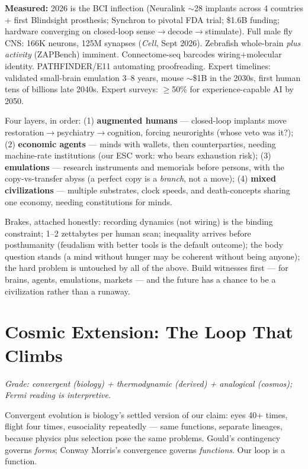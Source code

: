 \documentclass[11pt]{article}
\begin{document}
\textbf{Measured:} 2026 is the BCI inflection (Neuralink $\sim$28 implants across 4 countries + first Blindsight prosthesis; Synchron to pivotal FDA trial; \$1.6B funding; hardware converging on closed-loop sense$\to$decode$\to$stimulate). Full male fly CNS: 166K neurons, 125M synapses (\textit{Cell}, Sept 2026). Zebrafish whole-brain \emph{plus activity} (ZAPBench) imminent. Connectome-seq barcodes wiring+molecular identity. PATHFINDER/E11 automating proofreading. Expert timelines: validated small-brain emulation 3--8 years, mouse $\sim$\$1B in the 2030s, first human tens of billions late 2040s. Expert surveys: $\geq$50\% for experience-capable AI by 2050.

Four layers, in order: (1) \textbf{augmented humans} --- closed-loop implants move restoration$\to$psychiatry$\to$cognition, forcing neurorights (whose veto was it?); (2) \textbf{economic agents} --- minds with wallets, then counterparties, needing machine-rate institutions (our ESC work: who bears exhaustion risk); (3) \textbf{emulations} --- research instruments and memorials before persons, with the copy-vs-transfer abyss (a perfect copy is a \emph{branch}, not a move); (4) \textbf{mixed civilizations} --- multiple substrates, clock speeds, and death-concepts sharing one economy, needing constitutions for minds.

Brakes, attached honestly: recording dynamics (not wiring) is the binding constraint; 1--2 zettabytes per human scan; inequality arrives before posthumanity (feudalism with better tools is the default outcome); the body question stands (a mind without hunger may be coherent without being anyone); the hard problem is untouched by all of the above. Build witnesses first --- for brains, agents, emulations, markets --- and the future has a chance to be a civilization rather than a runaway.

\section{Cosmic Extension: The Loop That Climbs}
\label{sec:cosmos}

\textit{Grade: convergent (biology) + thermodynamic (derived) + analogical (cosmos); Fermi reading is interpretive.}

Convergent evolution is biology's settled version of our claim: eyes 40+ times, flight four times, eusociality repeatedly --- same functions, separate lineages, because physics plus selection pose the same problems. Gould's contingency governs \emph{forms}; Conway Morris's convergence governs \emph{functions}. Our loop is a function.
\end{document}
